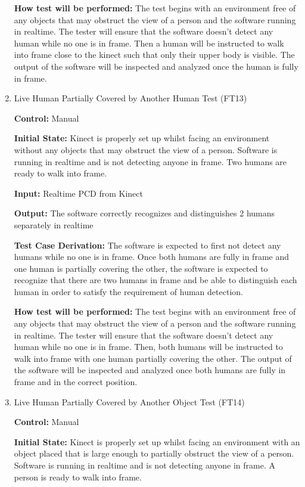 \documentclass[12pt, titlepage]{article}
\begin{document}
\begin{enumerate}
\textbf{How test will be performed:} The test begins with an environment free of any objects that may obstruct the view of a person and the software running in realtime. The tester will ensure that the software doesn't detect any human while no one is in frame. Then a human will be instructed to walk into frame close to the kinect such that only their upper body is visible. The output of the software will be inspected and analyzed once the human is fully in frame. 
	
\item{Live Human Partially Covered by Another Human Test (FT13)\\}

\textbf{Control:} Manual

\textbf{Initial State:} Kinect is properly set up whilst facing an environment without any objects that may obstruct the view of a person. Software is running in realtime and is not detecting anyone in frame. Two humans are ready to walk into frame.

\textbf{Input:} Realtime PCD from Kinect

\textbf{Output:} The software correctly recognizes and distinguishes 2 humans separately in realtime

\textbf{Test Case Derivation:} The software is expected to first not detect any humans while no one is in frame. Once both humans are fully in frame and one human is partially covering the other, the software is expected to recognize that there are two humans in frame and be able to distinguish each human in order to satisfy the requirement of human detection.

\textbf{How test will be performed:} The test begins with an environment free of any objects that may obstruct the view of a person and the software running in realtime. The tester will ensure that the software doesn't detect any human while no one is in frame. Then, both humans will be instructed to walk into frame with one human partially covering the other. The output of the software will be inspected and analyzed once both humans are fully in frame and in the correct position.

\item{Live Human Partially Covered by Another Object Test (FT14)\\}

\textbf{Control:} Manual

\textbf{Initial State:} Kinect is properly set up whilst facing an environment with an object placed that is large enough to partially obstruct the view of a person. Software is running in realtime and is not detecting anyone in frame. A person is ready to walk into frame.


\end{enumerate}
\end{document}
